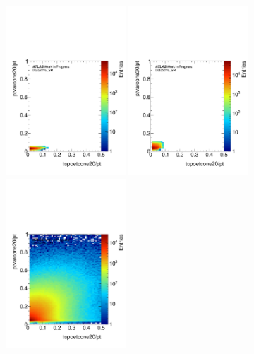 \begin{figure}[htbp]
\centering
\includegraphics[width=0.4\textwidth]{figures/mj/plot2D-Data2015_SR-el_lep_0_iso_topoetcone20dPtVSel_lep_0_iso_ptvarcone20dPt-el.pdf}
\includegraphics[width=0.4\textwidth]{figures/mj/plot2D-Data2015_SR-mu_lep_0_iso_topoetcone20dPtVSmu_lep_0_iso_ptvarcone30dPt-mu.pdf}
\\
\includegraphics[width=0.4\textwidth]{figures/mj/plot2D-Data2015_MJ-el_lep_0_iso_topoetcone20dPtVSel_lep_0_iso_ptvarcone20dPt-el.pdf}

\end{figure}
